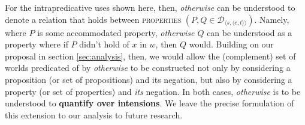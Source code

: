 For the intrapredicative uses shown here, then, \textit{otherwise} can be understood to denote a relation that holds between \textsc{properties} $ (P,Q\in\mathcal D_{\langle s,\langle e,t\rangle\rangle}) $. Namely, where $ P $ is some accommodated property, \textit{otherwise $ Q $} can be understood as a property where if $ P $ didn't hold of $ x $ in $ w $, then $ Q $ would. Building on our proposal in section \ref{sec:analysis}, then, we would allow the (complement) set of worlds predicated of by \textit{otherwise} to be constructed not only by considering a proposition (or set of propositions) and its negation, but also by considering a property (or set of properties) and \textit{its} negation. In both cases, \textit{otherwise} is to be understood to \textbf{quantify over intensions}. We leave the precise formulation of this extension to our analysis to future research.%
%
%
% 

